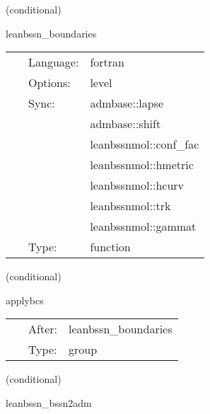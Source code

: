 \vspace{5mm}

   (conditional) 

\hspace{5mm} leanbssn\_boundaries 

\hspace{5mm}{\it mol boundary enforcement } 


\hspace{5mm}

 \begin{tabular*}{160mm}{cll} 
~ & Language:  & fortran \\ 
~ & Options:  & level \\ 
~ & Sync:  & admbase::lapse \\ 
~& ~ &admbase::shift\\ 
~& ~ &leanbssnmol::conf\_fac\\ 
~& ~ &leanbssnmol::hmetric\\ 
~& ~ &leanbssnmol::hcurv\\ 
~& ~ &leanbssnmol::trk\\ 
~& ~ &leanbssnmol::gammat\\ 
~ & Type:  & function \\ 
\end{tabular*} 


\vspace{5mm}

   (conditional) 

\hspace{5mm} applybcs 

\hspace{5mm}{\it apply boundary conditions } 


\hspace{5mm}

 \begin{tabular*}{160mm}{cll} 
~ & After:  & leanbssn\_boundaries \\ 
~ & Type:  & group \\ 
\end{tabular*} 


\vspace{5mm}

   (conditional) 

\hspace{5mm} leanbssn\_bssn2adm 

\hspace{5mm}{\it convert variables back to the adm ones } 


